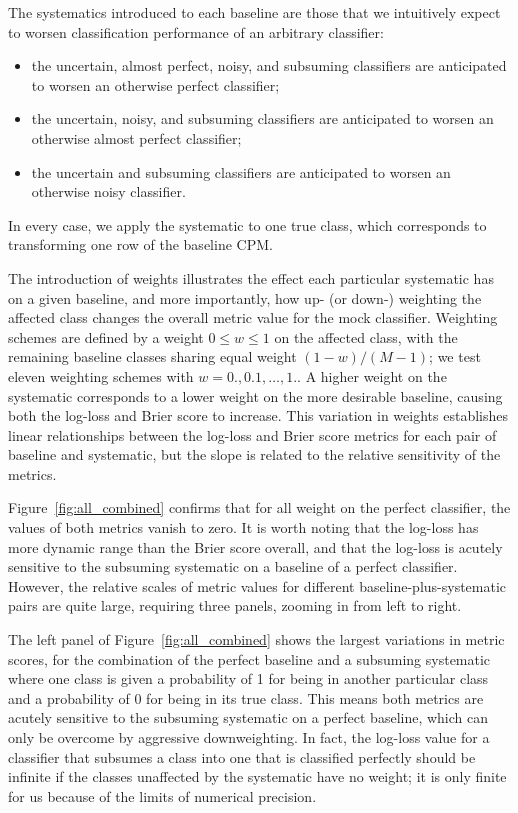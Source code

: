 The systematics introduced to each baseline are those that we intuitively expect to worsen classification performance of an arbitrary classifier:
\begin{itemize}
\item the uncertain, almost perfect, noisy, and subsuming classifiers are anticipated to worsen an otherwise perfect classifier;
\item the uncertain, noisy, and subsuming classifiers are anticipated to worsen an otherwise almost perfect classifier;
\item the uncertain and subsuming classifiers are anticipated to worsen an otherwise noisy classifier.
\end{itemize}
In every case, we apply the systematic to one true class, which corresponds to transforming one row of the baseline CPM.

The introduction of weights illustrates the effect each particular systematic has on a given baseline, and more importantly, how up- (or down-) weighting the affected class changes the overall metric value for the mock classifier.
Weighting schemes are defined by a weight $0 \leq w \leq 1$ on the affected class, with the remaining baseline classes sharing equal weight $(1 - w) / (M - 1)$; we test eleven weighting schemes with $w = 0., 0.1, \dots, 1.$.
A higher weight on the systematic corresponds to a lower weight on the more desirable baseline, causing both the log-loss and Brier score to increase.
This variation in weights establishes linear relationships between the log-loss and Brier score metrics for each pair of baseline and systematic, but the slope is related to the relative sensitivity of the metrics.

Figure~\ref{fig:all_combined} confirms that for all weight on the perfect classifier, the values of both metrics vanish to zero.
It is worth noting that the log-loss has more dynamic range than the Brier score overall, and that the log-loss is acutely sensitive to the subsuming systematic on a baseline of a perfect classifier.
However, the relative scales of metric values for different baseline-plus-systematic pairs are quite large, requiring three panels, zooming in from left to right.

The left panel of Figure~\ref{fig:all_combined} shows the largest variations in metric scores, for the combination of the perfect baseline and a subsuming systematic where one class is given a probability of 1 for being in another particular class and a probability of 0 for being in its true class.
This means both metrics are acutely sensitive to the subsuming systematic on a perfect baseline, which can only be overcome by aggressive downweighting.
In fact, the log-loss value for a classifier that subsumes a class into one that is classified perfectly should be infinite if the classes unaffected by the systematic have no weight; it is only finite for us because of the limits of numerical precision.

